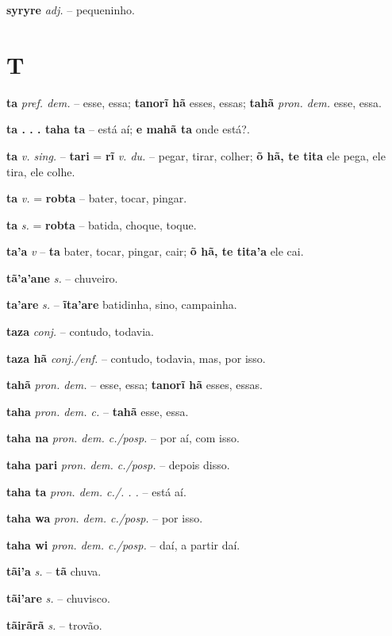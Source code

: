 \textbf{syryre} \textit{adj.} --  pequeninho.


\section*{T}



\textbf{ta} \textit{pref. dem.} -- esse, essa; \textbf{tanorĩ hã} esses, essas; \textbf{tahã} \textit{pron. dem.} esse, essa.

\textbf{ta . . . taha ta} \textit{} -- está aí; \textbf{e mahã ta} onde está?.

\textbf{ta} \textit{v. sing.} -- \textbf{tari} = \textbf{rĩ} \textit{v. du.} -- pegar, tirar, colher; \textbf{õ hã, te tita} ele pega, ele tira, ele colhe.

\textbf{ta} \textit{v.} = \textbf{robta} -- bater, tocar, pingar.

\textbf{ta} \textit{s.} = \textbf{robta} -- batida, choque, toque.

\textbf{ta'a} \textit{v} -- \textbf{ta} bater, tocar, pingar, cair; \textbf{õ hã, te tita'a} ele cai.

\textbf{tã'a'ane} \textit{s.} -- chuveiro.

\textbf{ta'are} \textit{s.} -- \textbf{ĩta'are} batidinha, sino, campainha.

\textbf{taza} \textit{conj.} -- contudo, todavia.

\textbf{taza hã} \textit{conj./enf.} -- contudo, todavia, mas, por isso.

\textbf{tahã} \textit{pron. dem.} -- esse, essa; \textbf{tanorĩ hã} esses, essas.

\textbf{taha} \textit{pron. dem. c.} -- \textbf{tahã} esse, essa.

\textbf{taha na} \textit{pron. dem. c./posp.} -- por aí, com isso.

\textbf{taha pari} \textit{pron. dem. c./posp.} -- depois disso.

\textbf{taha ta} \textit{pron. dem. c./. . .} -- está aí.

\textbf{taha wa} \textit{pron. dem. c./posp.} -- por isso.

\textbf{taha wi} \textit{pron. dem. c./posp.} -- daí, a partir daí.

\textbf{tãi'a} \textit{s.} -- \textbf{tã} chuva.

\textbf{tãi'are} \textit{s.} -- chuvisco.

\textbf{tãirãrã} \textit{s.} -- trovão.

